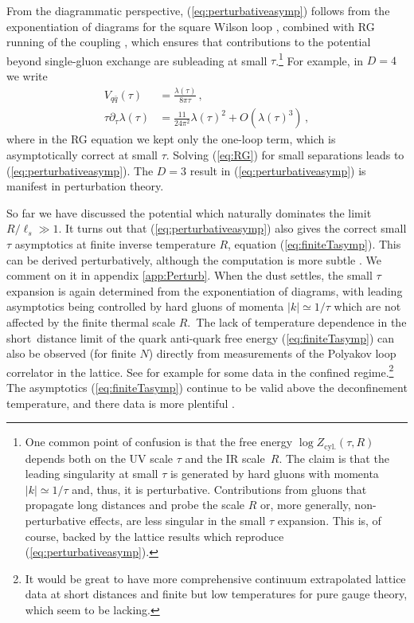 \documentclass[
 reprint,
 amsmath,
 pre,
 amssymb,
 nofootinbib,
 aps,
 longbibliography,
]{revtex4-1}
\newcommand{\<}{{\langle}}
\renewcommand{\>}{{\rangle}}
\begin{document}
From the diagrammatic perspective, (\ref{eq:perturbativeasymp}) follows from the exponentiation of diagrams for the square Wilson loop \cite{Susskind:LesHouches1976,Fischler:1977yf,Appelquist:1977es,Gatheral:1983cz,Frenkel:1984pz}, combined with RG running of the coupling \cite{Gross:1973id,Politzer:1973fx}, which ensures that contributions to the potential beyond single-gluon exchange are subleading at small $\tau$.\footnote{One common point of confusion is that the free energy $\log Z_{\text{cyl.}}(\tau,R)$ depends both on the UV scale $\tau$ and the IR scale~$R$. The claim is that the leading singularity at small $\tau$ is generated by hard gluons with momenta $|k|\simeq1/\tau$ and, thus, it is perturbative. Contributions from gluons that propagate long distances and probe the scale $R$ or, more generally, non-perturbative effects, are less singular in the small $\tau$ expansion. This is, of course, backed by the lattice results which reproduce (\ref{eq:perturbativeasymp}).} For example, in $D=4$ we write
\begin{align}
    V_{q\bar{q}}(\tau) &= \frac{\lambda(\tau)}{8\pi \tau} \,,\nonumber\\
\tau\partial_\tau   \lambda(\tau) &= \frac{11}{24\pi^2} \lambda(\tau)^2 + O(\lambda(\tau)^3)\,, \label{eq:RG}
\end{align}
where in the RG equation we kept only the one-loop term, which is asymptotically correct at small $\tau$. Solving (\ref{eq:RG}) for small separations leads to (\ref{eq:perturbativeasymp}). The $D=3$ result in (\ref{eq:perturbativeasymp}) is manifest in perturbation theory.

So far we have discussed the potential which naturally dominates the limit $R/\ell_s \gg 1$. It turns out that (\ref{eq:perturbativeasymp}) also gives the correct small $\tau$ asymptotics at finite inverse temperature $R$, equation (\ref{eq:finiteTasymp}). This can be derived perturbatively, although the computation is more subtle \cite{Berwein:2017thy,Brown:1979ya,McLerran:1981pb,Nadkarni:1986cz,Nadkarni:1986as}. We comment on it in appendix \ref{app:Perturb}. When the dust settles, the small $\tau$ expansion is again determined from the exponentiation of diagrams, with leading asymptotics being controlled by hard gluons of momenta $|k| \simeq 1/\tau$ which are not affected by the finite thermal scale $R$.~The lack of temperature dependence in the short~distance limit of the quark anti-quark free energy (\ref{eq:finiteTasymp}) can also be observed (for finite $N$) directly from measurements of the Polyakov loop correlator in the lattice. See for example \cite{Bazavov:2008rw} for some data in the confined regime.\footnote{It would be great to have more comprehensive continuum extrapolated lattice data at short distances and finite but low temperatures for pure gauge theory, which seem to be lacking.} The asymptotics (\ref{eq:finiteTasymp})
continue to be valid above the deconfinement temperature, and there data is more plentiful \cite{Kaczmarek:2002mc, Weber:2017dmi}.
\end{document}
